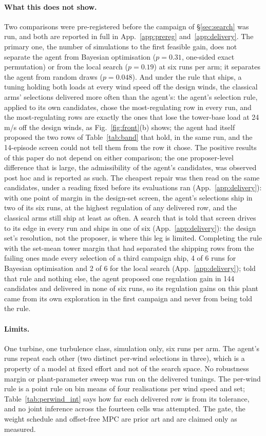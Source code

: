 \documentclass{article}
\begin{document}
\paragraph{What this does not show.} Two comparisons were pre-registered before the campaign of §\ref{sec:search} was run, and both are reported in full in App.~\ref{app:prereg} and~\ref{app:delivery}. The primary one, the number of simulations to the first feasible gain, does not separate the agent from Bayesian optimisation ($p = 0.31$, one-sided exact permutation) or from the local search ($p = 0.19$) at six runs per arm; it separates the agent from random draws ($p = 0.048$). And under the rule that ships, a tuning holding both loads at every wind speed off the design winds, the classical arms' selections delivered more often than the agent's: the agent's selection rule, applied to its own candidates, chose the most-regulating row in every run, and the most-regulating rows are exactly the ones that lose the tower-base load at 24\,m/s off the design winds, as Fig.~\ref{fig:front}(b) shows; the agent had itself proposed the two rows of Table~\ref{tab:band} that hold, in the same run, and the 14-episode screen could not tell them from the row it chose. The positive results of this paper do not depend on either comparison; the one proposer-level difference that is large, the admissibility of the agent's candidates, was observed post hoc and is reported as such. The cheapest repair was then read on the same candidates, under a reading fixed before its evaluations ran (App.~\ref{app:delivery}): with one point of margin in the design-set screen, the agent's selections ship in two of its six runs, at the highest regulation of any delivered row, and the classical arms still ship at least as often. A search that is told that screen drives to its edge in every run and ships in one of six (App.~\ref{app:delivery}): the design set's resolution, not the proposer, is where this leg is limited. Completing the rule with the set-mean tower margin that had separated the shipping rows from the failing ones made every selection of a third campaign ship, 4 of 6 runs for Bayesian optimisation and 2 of 6 for the local search (App.~\ref{app:delivery}); told that rule and nothing else, the agent proposed one regulation gain in 144 candidates and delivered in none of six runs, so its regulation gains on this plant came from its own exploration in the first campaign and never from being told the rule.

\paragraph{Limits.} One turbine, one turbulence class, simulation only, six runs per arm. The agent's runs repeat each other (two distinct per-wind selections in three), which is a property of a model at fixed effort and not of the search space. No robustness margin or plant-parameter sweep was run on the delivered tunings. The per-wind rule is a point rule on bin means of four realisations per wind speed and set; Table~\ref{tab:perwind_int} says how far each delivered row is from its tolerance, and no joint inference across the fourteen cells was attempted. The gate, the weight schedule and offset-free MPC are prior art and are claimed only as measured.
\end{document}
